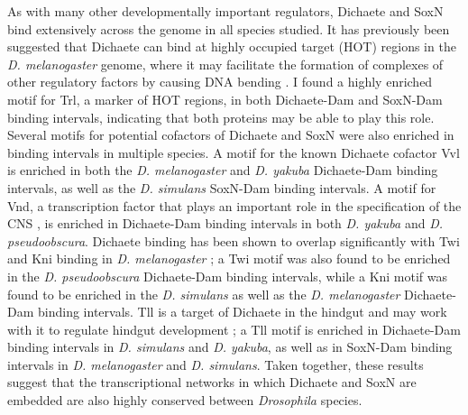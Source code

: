 As with many other developmentally important regulators, Dichaete and SoxN bind extensively across the genome in all species studied. It has previously been suggested that Dichaete can bind at highly occupied target (HOT) regions in the \emph{D. melanogaster} genome, where it may facilitate the formation of complexes of other regulatory factors by causing DNA bending \citep{aleksic_role_2013}. I found a highly enriched motif for Trl, a marker of HOT regions, in both Dichaete-Dam and SoxN-Dam binding intervals, indicating that both proteins may be able to play this role. Several motifs for potential cofactors of Dichaete and SoxN were also enriched in binding intervals in multiple species. A motif for the known Dichaete cofactor Vvl is enriched in both the \emph{D. melanogaster} and \emph{D. yakuba} Dichaete-Dam binding intervals, as well as the \emph{D. simulans} SoxN-Dam binding intervals. A motif for Vnd, a transcription factor that plays an important role in the specification of the CNS \citep{ferrero_soxneuro_2014,zhao_sox-domain_2002}, is enriched in Dichaete-Dam binding intervals in both \emph{D. yakuba} and \emph{D. pseudoobscura}. Dichaete binding has been shown to overlap significantly with Twi and Kni binding in \emph{D. melanogaster} \citep{aleksic_role_2013}; a Twi motif was also found to be enriched in the \emph{D. pseudoobscura} Dichaete-Dam binding intervals, while a Kni motif was found to be enriched in the \emph{D. simulans} as well as the \emph{D. melanogaster} Dichaete-Dam binding intervals. Tll is a target of Dichaete in the hindgut and may work with it to regulate hindgut development \citep{aleksic_role_2013}; a Tll motif is enriched in Dichaete-Dam binding intervals in \emph{D. simulans} and \emph{D. yakuba}, as well as in SoxN-Dam binding intervals in \emph{D. melanogaster} and \emph{D. simulans}. Taken together, these results suggest that the transcriptional networks in which Dichaete and SoxN are embedded are also highly conserved between \emph{Drosophila} species.

